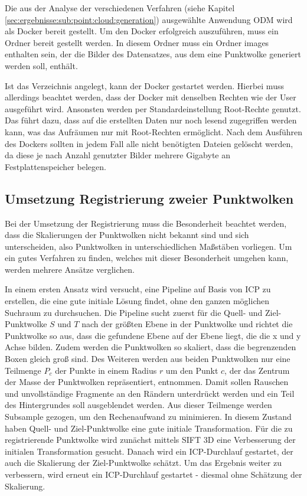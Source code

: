 \documentclass[12pt,titlepage, twoside]{article}
\begin{document}
Die aus der Analyse der verschiedenen Verfahren (siehe Kapitel \ref{sec:ergebnisse:sub:point:cloud:generation}) ausgewählte Anwendung ODM wird als Docker bereit gestellt. Um den Docker erfolgreich auszuführen, muss ein Ordner bereit gestellt werden.
In diesem Ordner muss ein Ordner \glqq images\grqq{} enthalten sein, der die Bilder des Datensatzes, aus dem eine Punktwolke generiert werden soll, enthält.

Ist das Verzeichnis angelegt, kann der Docker gestartet werden. Hierbei muss allerdings beachtet werden, dass der Docker mit denselben Rechten wie der User ausgeführt wird. 
Ansonsten werden per Standardeinstellung Root-Rechte genutzt.
Das führt dazu, dass auf die erstellten Daten nur noch lesend zugegriffen werden kann, was das Aufräumen nur mit Root-Rechten ermöglicht.
Nach dem Ausführen des Dockers sollten in jedem Fall alle nicht benötigten Dateien gelöscht werden, da diese je nach Anzahl genutzter Bilder mehrere Gigabyte an Festplattenspeicher belegen.

\subsection{Umsetzung Registrierung zweier Punktwolken}
\label{sec:realisierung:implementierung2}

Bei der Umsetzung der Registrierung muss die Besonderheit beachtet werden, dass die Skalierungen der Punktwolken nicht bekannt sind und sich unterscheiden, 
also Punktwolken in unterschiedlichen Maßstäben vorliegen. 
Um ein gutes Verfahren zu finden, welches mit dieser Besonderheit umgehen kann, werden mehrere Ansätze verglichen.

In einem ersten Ansatz wird versucht, eine Pipeline auf Basis von ICP zu erstellen, die eine gute initiale Lösung findet, ohne den ganzen möglichen Suchraum zu durchsuchen.
Die Pipeline sucht zuerst für die Quell- und Ziel-Punktwolke $S$ und $T$ nach der größten Ebene in der Punktwolke und richtet die Punktwolke so aus, dass die gefundene Ebene auf der Ebene liegt, die die x und y Achse bilden.
Zudem werden die Punktwolken so skaliert, dass die begrenzenden Boxen gleich groß sind.
Des Weiteren werden aus beiden Punktwolken nur eine Teilmenge $P_c$ der Punkte in einem Radius $r$ um den Punkt $c$, der das Zentrum der Masse der Punktwolken repräsentiert, entnommen.
Damit sollen Rauschen und unvollständige Fragmente an den Rändern unterdrückt werden und ein Teil des Hintergrundes soll ausgeblendet werden.
Aus dieser Teilmenge werden Subsample gezogen, um den Rechenaufwand zu minimieren. In diesem Zustand haben Quell- und Ziel-Punktwolke eine gute initiale Transformation.
Für die zu registrierende Punktwolke wird zunächst mittels SIFT 3D \cite{Sift3D} eine Verbesserung der initialen Transformation gesucht. 
Danach wird ein ICP-Durchlauf gestartet, der auch die Skalierung der Ziel-Punktwolke schätzt.
Um das Ergebnis weiter zu verbessern, wird erneut ein ICP-Durchlauf gestartet - diesmal ohne Schätzung der Skalierung.
\end{document}
